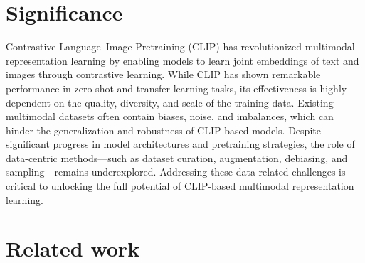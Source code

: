\documentclass[11pt,letterpaper]{article}
\begin{document}
\section{Significance}
Contrastive Language–Image Pretraining (CLIP) has revolutionized multimodal representation learning by enabling models to learn joint embeddings of text and images through contrastive learning. While CLIP has shown remarkable performance in zero-shot and transfer learning tasks, its effectiveness is highly dependent on the quality, diversity, and scale of the training data. Existing multimodal datasets often contain biases, noise, and imbalances, which can hinder the generalization and robustness of CLIP-based models. Despite significant progress in model architectures and pretraining strategies, the role of data-centric methods—such as dataset curation, augmentation, debiasing, and sampling—remains underexplored. Addressing these data-related challenges is critical to unlocking the full potential of CLIP-based multimodal representation learning.



\section{Related work}
\end{document}
